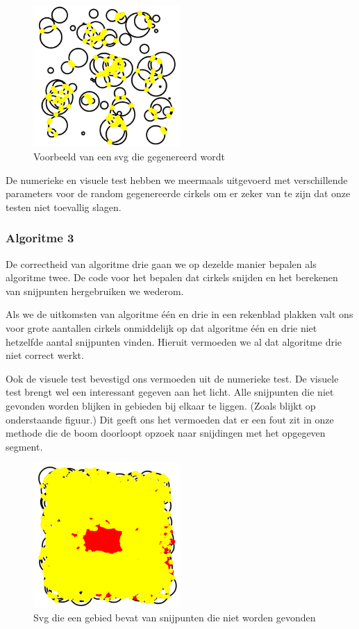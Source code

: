 \documentclass[11pt,a4paper]{article}
\begin{document}
\begin{figure}[H]
\centering
\includegraphics[width=0.5\textwidth]{vb_svg.png}
\caption*{Voorbeeld van een svg die gegenereerd wordt}
\end{figure}

De numerieke en visuele test hebben we meermaals uitgevoerd met verschillende parameters voor de random gegenereerde cirkels om er zeker van te zijn dat onze testen niet toevallig slagen.

\subsubsection*{Algoritme 3}

De correctheid van algoritme drie gaan we op dezelde manier bepalen als algoritme twee. De code voor het bepalen dat cirkels snijden en het berekenen van snijpunten hergebruiken we wederom.

Als we de uitkomsten van algoritme \'e\'en en drie in een rekenblad plakken valt ons voor grote aantallen cirkels onmiddelijk op dat algoritme \'e\'en en drie niet hetzelfde aantal snijpunten vinden. Hieruit vermoeden we al dat algoritme drie niet correct werkt.

Ook de visuele test bevestigd ons vermoeden uit de numerieke test. De visuele test brengt wel een interessant gegeven aan het licht. Alle snijpunten die niet gevonden worden blijken in gebieden bij elkaar te liggen. (Zoals blijkt op onderstaande figuur.) Dit geeft ons het vermoeden dat er een fout zit in onze methode die de boom doorloopt opzoek naar snijdingen met het opgegeven segment.

\begin{figure}[H]
\centering
\includegraphics[width=0.5\textwidth]{gat_midden.png}
\caption*{Svg die een gebied bevat van snijpunten die niet worden gevonden}
\end{figure}
\end{document}
